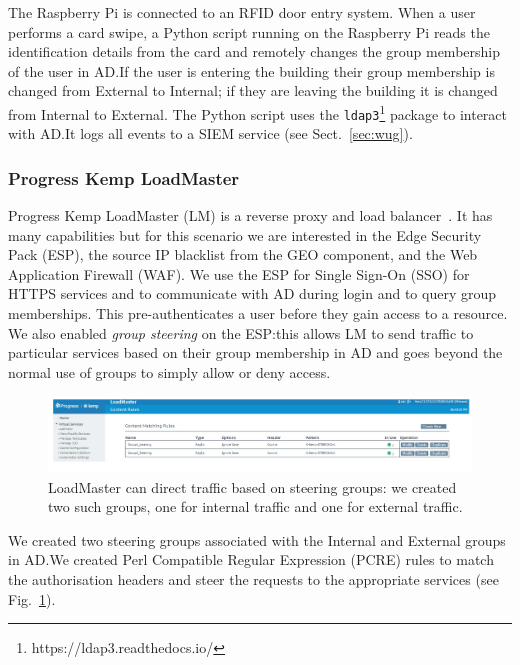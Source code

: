The Raspberry Pi is connected to an RFID door entry system.  When a
user performs a card swipe, a Python script running on the Raspberry
Pi reads the identification details from the card and remotely changes
the group membership of the user in AD.\@ If the user is entering the
building their group membership is changed from External to Internal;
if they are leaving the building it is changed from Internal to
External.  The Python script uses the
\texttt{ldap3}\footnote{https://ldap3.readthedocs.io/} package to
interact with AD.\@ It logs all events to a SIEM service (see
Sect.~\ref{sec:wug}).

\subsubsection{Progress Kemp LoadMaster}

Progress Kemp LoadMaster (LM) is a reverse proxy and load
balancer~\cite{progress-kemp-loadmaster-xx}.  It has many capabilities
but for this scenario we are interested in the Edge Security Pack
(ESP), the source IP blacklist from the GEO component, and the Web
Application Firewall (WAF).  We use the ESP for Single Sign-On (SSO)
for HTTPS services and to communicate with AD during login and to
query group memberships.  This pre-authenticates a user before they
gain access to a resource.  We also enabled \textit{group steering} on
the ESP:\@ this allows LM to send traffic to particular services based
on their group membership in AD and goes beyond the normal use of
groups to simply allow or deny access.

\begin{figure}
  \centerline{\includegraphics[width=\textwidth]{img/loadmaster-pcre-rules}}
  \caption{LoadMaster can direct traffic based on steering groups: we
    created two such groups, one for internal traffic and one for
    external traffic.}\label{fig:loadmaster-pcre-rules}
\end{figure}

We created two steering groups associated with the Internal and
External groups in AD.\@ We created Perl Compatible Regular Expression
(PCRE) rules to match the authorisation headers and steer the requests
to the appropriate services (see
Fig.~\ref{fig:loadmaster-pcre-rules}).

